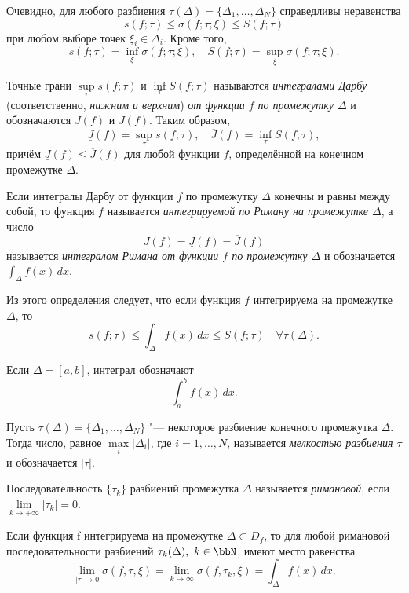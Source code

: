 Очевидно, для любого разбиения $\tau(\Delta) = \{ \Delta_1, \ldots, \Delta_N\}$ справедливы неравенства
$$
s(f; \tau) \le \sigma(f; \tau; \xi) \le S(f; \tau)
$$
при любом выборе точек $\xi_i \in \Delta_i$. Кроме того,
$$
s(f; \tau) = \inf_{\xi} \sigma(f; \tau; \xi), \quad S(f; \tau) = \sup_{\xi} \sigma(f; \tau; \xi).
$$

\begin{defn}
Точные грани $\sup\limits_{\tau} s(f; \tau)$ и $\inf\limits_{\tau} S(f; \tau)$ называются \textit{интегралами Дарбу} (соответственно, \textit{нижним и верхним}) \textit{от функции $f$ по промежутку $\Delta$} и обозначаются $\underline{J}(f)$ и $\overline{J}(f)$. Таким образом,
$$
\underline{J}(f) = \sup_{\tau} s(f; \tau), \quad \overline{J}(f) = \inf_{\tau} S(f; \tau),
$$
причём $\underline{J}(f) \le \overline{J}(f)$ для любой функции $f$, определённой на конечном промежутке 
$\Delta$.
\end{defn}


\begin{defn}
Если интегралы Дарбу от функции $f$ по промежутку $\Delta$ конечны и равны между собой, то функция $f$ называется \textit{интегрируемой по Риману на промежутке $\Delta$}, а число
$$
J(f) = \underline{J}(f) = \overline{J}(f)
$$
называется \textit{интегралом Римана от функции $f$ по промежутку $\Delta$} и обозначается $\int_{\Delta} f(x) \,dx$.
\end{defn}

Из этого определения следует, что если функция $f$ интегрируема на промежутке $\Delta$, то
$$
s(f; \tau) \le \int_{\Delta} f(x) \,dx \le S(f; \tau) \quad \forall \tau(\Delta).
$$

Если $\Delta = [a, b]$, интеграл обозначают $$\int_{a}^{b} f(x) \,dx.$$

\begin{defn}
Пусть $\tau(\Delta) = \{ \Delta_1, \ldots, \Delta_N\}$ "--- некоторое разбиение конечного промежутка $\Delta$. Тогда число, равное $\max\limits_i|\Delta_i|$, где $i=1,\ldots,N$, называется \textit{мелкостью разбиения $\tau$} и обозначается $|\tau|$.
\end{defn}

\begin{defn}
Последовательность $\{\tau_k\}$ разбиений промежутка $\Delta$ называется \textit{римановой}, если $\lim\limits_{k \to +\infty}|\tau_k|=0$.
\end{defn}

\begin{thm} \label{ch11.1thm1}
Если функция f интегрируема на промежутке $\Delta \subset D_f$, то для любой римановой последовательности разбиений $\tau_k(\Delta),\ k\in \bbN$, имеют место равенства
\begin{equation} \label{ch11.1eq1}
\lim_{|\tau| \to 0} \sigma(f, \tau, \xi) = \lim_{k \to \infty} \sigma(f, \tau_k, \xi) = \int_{\Delta} f(x) \,dx.
\end{equation}
\end{thm}

